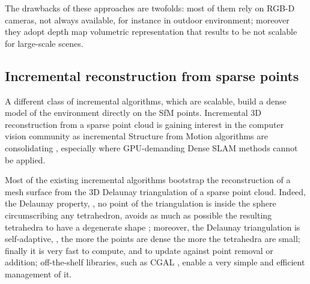 The drawbacks of these approaches are twofolds: most of them rely on RGB-D cameras, not always available, for instance in outdoor environment; moreover they adopt depth map  volumetric representation that results to be not scalable for large-scale scenes.  


\subsection{Incremental reconstruction from sparse points}
A different class of incremental algorithms, which are scalable, build a dense model of the environment directly on the SfM points.
Incremental 3D reconstruction from a sparse point cloud is gaining interest in the computer vision community as incremental Structure from Motion algorithms are consolidating  \cite{wu13}, especially where GPU-demanding Dense SLAM methods cannot be applied. 

Most of the existing incremental algorithms \cite{lovi_et_al_11,Pan_et_al09,litvinov_lhuillier_13,litvinov_Lhiuller14} bootstrap the reconstruction of a mesh surface from the 3D Delaunay triangulation of a sparse point cloud. Indeed, the Delaunay property, \ie, no point of the triangulation is inside the sphere circumscribing any tetrahedron, avoids as much as possible the resulting tetrahedra to have a degenerate shape \cite{Maur_02}; moreover, the Delaunay triangulation  is self-adaptive, \ie, the more the points are dense the more the tetrahedra are small; finally it is very fast to compute, and to  update against point removal or addition; off-the-shelf libraries, such as CGAL \cite{cgal}, enable a very simple and efficient management of it. 

